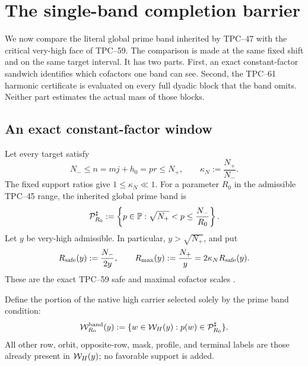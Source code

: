 \section{The single-band completion barrier}
\label{sec:single-band-barrier}

We now compare the literal global prime band inherited by TPC--47 with the
critical very-high face of TPC--59.  The comparison is made at the same
fixed shift and on the same target interval.  It has two parts.  First, an
exact constant-factor sandwich identifies which cofactors one band can
see.  Second, the TPC--61 harmonic certificate is evaluated on every full
dyadic block that the band omits.  Neither part estimates the actual mass
of those blocks.

\subsection{An exact constant-factor window}

Let every target satisfy
\begin{equation}
 N_-\le n=mj+h_0=pr\le N_+,
 \qquad
 \kappa_N:=\frac{N_+}{N_-}.
 \label{eq:band-target-endpoints}
\end{equation}
The fixed support ratios give \(1\le\kappa_N\ll1\).  For a parameter
\(R_0\) in the admissible TPC--45 range, the inherited global prime band is
\begin{equation}
 \mathcal P_{R_0}^{\sharp}
 :=\left\{p\in\mathbb P:
      \sqrt{N_+}<p\le\frac{N_-}{R_0}\right\}.
 \label{eq:band-single-prime-band}
\end{equation}
Let \(y\) be very-high admissible.  In particular,
\(y>\sqrt{N_+}\), and put
\begin{equation}
 R_{\rm safe}(y):=\frac{N_-}{2y},
 \qquad
 R_{\max}(y):=\frac{N_+}{y}
 =2\kappa_NR_{\rm safe}(y).
 \label{eq:band-safe-max}
\end{equation}
These are the exact TPC--59 safe and maximal cofactor scales
\citep{WangTPC59}.

Define the portion of the native high carrier selected solely by the prime
band condition:
\begin{equation}
 \mathcal W_{R_0}^{\rm band}(y)
 :=\{w\in\mathcal W_H(y):p(w)\in\mathcal P_{R_0}^{\sharp}\}.
 \label{eq:band-high-intersection}
\end{equation}
All other row, orbit, opposite-row, mask, profile, and terminal labels are
those already present in \(\mathcal W_H(y)\); no favorable support is added.

